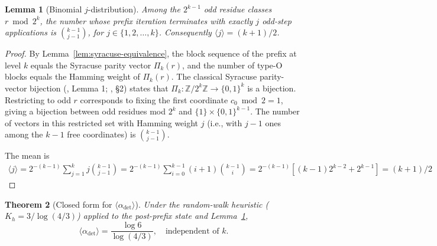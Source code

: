 \documentclass[pdflatex,sn-mathphys-num]{sn-jnl}
\theoremstyle{thmstyleone}%
\newtheorem{theorem}{Theorem}[section]
\newtheorem{lemma}[theorem]{Lemma}
\theoremstyle{definition}
\theoremstyle{plain}
\begin{document}
\begin{lemma}[Binomial $j$-distribution]
\label{lem:j-binomial}
Among the $2^{k-1}$ odd residue classes $r \bmod 2^k$, the number whose prefix iteration terminates with exactly $j$ odd-step applications is $\binom{k-1}{j-1}$, for $j \in \{1, 2, \ldots, k\}$. Consequently $\langle j \rangle = (k+1)/2$.
\end{lemma}

\begin{proof}
    By Lemma~\ref{lem:syracuse-equivalence}, the block sequence of the prefix at level $k$ equals the Syracuse parity vector $\Pi_k(r)$, and the number of type-O blocks equals the Hamming weight of $\Pi_k(r)$. The classical Syracuse parity-vector bijection (\citet{terras1976}, Lemma 1; \citealt{lagarias1985}, \S 2) states that $\Pi_k \colon \mathbb{Z}/2^k\mathbb{Z} \to \{0,1\}^k$ is a bijection. Restricting to odd $r$ corresponds to fixing the first coordinate $c_0 \bmod 2 = 1$, giving a bijection between odd residues mod $2^k$ and $\{1\} \times \{0,1\}^{k-1}$. The number of vectors in this restricted set with Hamming weight $j$ (i.e., with $j-1$ ones among the $k-1$ free coordinates) is $\binom{k-1}{j-1}$.

    The mean is
    \begin{align*}
    \langle j \rangle = 2^{-(k-1)} \sum_{j=1}^{k} j \binom{k-1}{j-1} = 2^{-(k-1)} \sum_{i=0}^{k-1} (i+1) \binom{k-1}{i} = 2^{-(k-1)} \left[ (k-1) 2^{k-2} + 2^{k-1} \right] = (k+1)/2
    \end{align*}
\end{proof}

\begin{theorem}[Closed form for $\langle \alpha_{\text{det}} \rangle$]
\label{thm:alpha-det-closed-form}
Under the random-walk heuristic ($K_h = 3/\log(4/3)$) applied to the post-prefix state and Lemma~\ref{lem:j-binomial},
$$\langle \alpha_{\text{det}} \rangle = \frac{\log 6}{\log(4/3)}, \quad \text{independent of } k.$$
\end{theorem}
\end{document}
